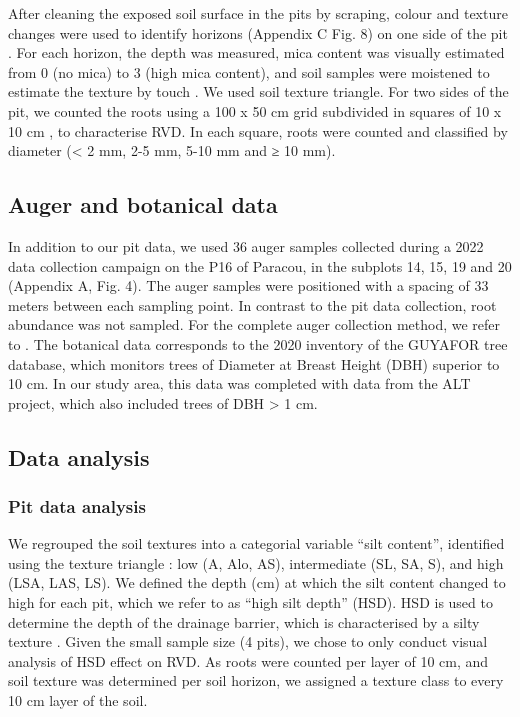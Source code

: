 \documentclass[fleqn,11pt]{latex/stylish_article} %
\begin{document}
After cleaning the exposed soil surface in the pits by scraping, colour and texture changes were used to identify horizons (Appendix C Fig. 8) on one side of the pit \citep{ferryGeneseFonctionnementHydrique2003}. For each horizon, the depth was measured, mica content was visually estimated from 0 (no mica) to 3 (high mica content), and soil samples were moistened to estimate the texture by touch \citep{jahnGuidelinesSoilDescription2006}. We used \citet{jamagneSoilMappingVital1977} soil texture triangle. For two sides of the pit, we counted the roots using a 100 x 50 cm grid subdivided in squares of 10 x 10 cm \citep{freschetStartingGuideRoot2021}, to characterise RVD. In each square, roots were counted and classified by diameter (\textless{} 2 mm, 2-5 mm, 5-10 mm and ≥ 10 mm).

\hypertarget{auger-and-botanical-data}{%
\subsection{Auger and botanical data}\label{auger-and-botanical-data}}

In addition to our pit data, we used 36 auger samples collected during a 2022 data collection campaign on the P16 of Paracou, in the subplots 14, 15, 19 and 20 (Appendix A, Fig. 4). The auger samples were positioned with a spacing of 33 meters between each sampling point. In contrast to the pit data collection, root abundance was not sampled. For the complete auger collection method, we refer to \citet{dognypietteAbioticFactorsRelated}.
The botanical data corresponds to the 2020 inventory of the GUYAFOR tree database, which monitors trees of Diameter at Breast Height (DBH) superior to 10 cm. In our study area, this data was completed with data from the ALT project, which also included trees of DBH \textgreater{} 1 cm.

\hypertarget{data-analysis}{%
\subsection{Data analysis}\label{data-analysis}}

\hypertarget{pit-data-analysis}{%
\subsubsection{Pit data analysis}\label{pit-data-analysis}}

We regrouped the soil textures into a categorial variable \enquote{silt content}, identified using the texture triangle \citep{jamagneSoilMappingVital1977}: low (A, Alo, AS), intermediate (SL, SA, S), and high (LSA, LAS, LS). We defined the depth (cm) at which the silt content changed to high for each pit, which we refer to as \enquote{high silt depth} (HSD). HSD is used to determine the depth of the drainage barrier, which is characterised by a silty texture \citep{ferryGeneseFonctionnementHydrique2003, humbelCaracterisationParMesures1978}. Given the small sample size (4 pits), we chose to only conduct visual analysis of HSD effect on RVD. As roots were counted per layer of 10 cm, and soil texture was determined per soil horizon, we assigned a texture class to every 10 cm layer of the soil.
\end{document}
